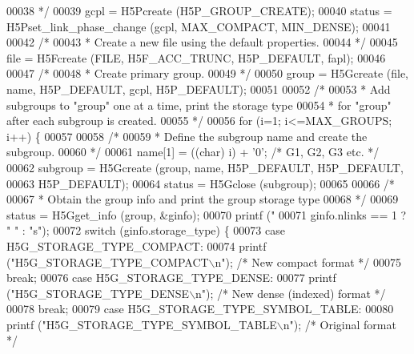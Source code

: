 \begin{DoxyCode}
00038 \textcolor{comment}{     */}
00039     gcpl = H5Pcreate (H5P\_GROUP\_CREATE);
00040     status = H5Pset\_link\_phase\_change (gcpl, MAX\_COMPACT, MIN\_DENSE);
00041 
00042     \textcolor{comment}{/*}
00043 \textcolor{comment}{     * Create a new file using the default properties.}
00044 \textcolor{comment}{     */}
00045     file = H5Fcreate (FILE, H5F\_ACC\_TRUNC, H5P\_DEFAULT, fapl);
00046 
00047     \textcolor{comment}{/*}
00048 \textcolor{comment}{     * Create primary group.}
00049 \textcolor{comment}{     */}
00050     group = H5Gcreate (file, name, H5P\_DEFAULT, gcpl, H5P\_DEFAULT);
00051 
00052     \textcolor{comment}{/*}
00053 \textcolor{comment}{     * Add subgroups to "group" one at a time, print the storage type}
00054 \textcolor{comment}{     * for "group" after each subgroup is created.}
00055 \textcolor{comment}{     */}
00056     \textcolor{keywordflow}{for} (i=1; i<=MAX\_GROUPS; i++) \{
00057 
00058         \textcolor{comment}{/*}
00059 \textcolor{comment}{         * Define the subgroup name and create the subgroup.}
00060 \textcolor{comment}{         */}
00061         name[1] = ((char) i) + \textcolor{charliteral}{'0'};     \textcolor{comment}{/* G1, G2, G3 etc. */}
00062         subgroup = H5Gcreate (group, name, H5P\_DEFAULT, H5P\_DEFAULT,
00063                     H5P\_DEFAULT);
00064         status = H5Gclose (subgroup);
00065 
00066         \textcolor{comment}{/*}
00067 \textcolor{comment}{         * Obtain the group info and print the group storage type}
00068 \textcolor{comment}{         */}
00069         status = H5Gget\_info (group, &ginfo);
00070         printf (\textcolor{stringliteral}{"%
00071                     ginfo.nlinks == 1 ? \textcolor{stringliteral}{" "} : \textcolor{stringliteral}{"s"});
00072         \textcolor{keywordflow}{switch} (ginfo.storage\_type) \{
00073             \textcolor{keywordflow}{case} H5G\_STORAGE\_TYPE\_COMPACT:
00074                 printf (\textcolor{stringliteral}{"H5G\_STORAGE\_TYPE\_COMPACT\(\backslash\)n"}); \textcolor{comment}{/* New compact format */}
00075                 \textcolor{keywordflow}{break};
00076             \textcolor{keywordflow}{case} H5G\_STORAGE\_TYPE\_DENSE:
00077                 printf (\textcolor{stringliteral}{"H5G\_STORAGE\_TYPE\_DENSE\(\backslash\)n"}); \textcolor{comment}{/* New dense (indexed) format */}
00078                 \textcolor{keywordflow}{break};
00079             \textcolor{keywordflow}{case} H5G\_STORAGE\_TYPE\_SYMBOL\_TABLE:
00080                 printf (\textcolor{stringliteral}{"H5G\_STORAGE\_TYPE\_SYMBOL\_TABLE\(\backslash\)n"}); \textcolor{comment}{/* Original format */}
}
\end{DoxyCode}
